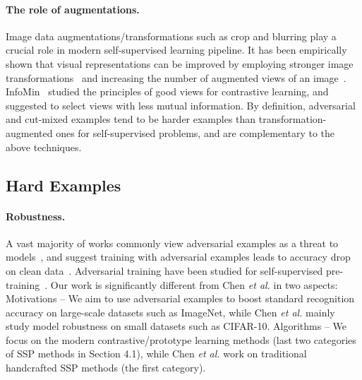 \documentclass[10pt,twocolumn,letterpaper]{article}
\newcommand{\ea}[0]{\emph{et al. }}
\begin{document}
\paragraph{The role of augmentations.} Image data augmentations/transformations such as crop and blurring play a crucial role in modern self-supervised learning pipeline. It has been empirically shown that visual representations can be improved by employing stronger image transformations~\cite{chen2020improved} and increasing the number of augmented views of an image~\cite{caron2020unsupervised}. InfoMin~\cite{tian2020makes} studied the principles of good views for contrastive learning, and suggested to select views with less mutual information. By definition, adversarial and cut-mixed examples tend to be harder examples than transformation-augmented ones for self-supervised problems, and are complementary to the above techniques.

\subsection{Hard Examples}
\paragraph{Robustness.} A vast majority of works commonly view adversarial examples as a threat to models~\cite{goodfellow2014explaining,madry2017towards}, and suggest training with adversarial examples leads to accuracy drop on clean data~\cite{raghunathan2019adversarial,min2020curious}.
Adversarial training have been studied for self-supervised pre-training~\cite{chen2020adversarial}. Our work is significantly different from Chen \ea\cite{chen2020adversarial} in two aspects: 
 Motivations -- We aim to use adversarial examples to boost standard recognition accuracy on large-scale datasets such as ImageNet, while Chen \ea\cite{chen2020adversarial} mainly study model robustness on small datasets such as CIFAR-10.
 Algorithms -- We focus on the modern contrastive/prototype learning methods (last two categories of SSP methods in Section 4.1), while Chen \ea\cite{chen2020adversarial} work on traditional handcrafted SSP methods (the first category). 
\end{document}
